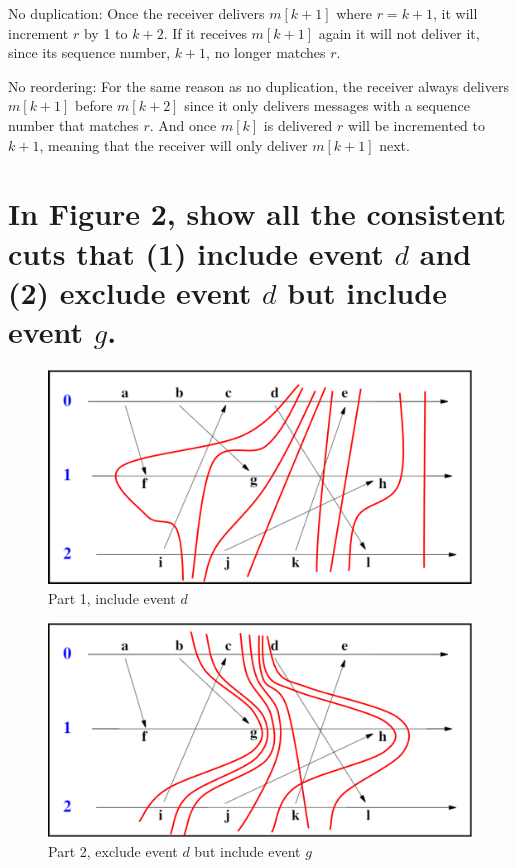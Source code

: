 \documentclass[times]{article}
\begin{document}
		No duplication: Once the receiver delivers $m[k+1]$ where $r=k+1$, it will increment $r$ by 1 to $k+2$. If it receives $m[k+1]$ again it will not deliver it, since its sequence number, $k+1$, no longer matches $r$.
		
		No reordering: For the same reason as no duplication, the receiver always delivers $m[k+1]$ before $m[k+2]$ since it only delivers messages with a sequence number that matches $r$. And once $m[k]$ is delivered $r$ will be incremented to $k+1$, meaning that the receiver will only deliver $m[k+1]$ next.
	
	\section{In Figure 2, show all the consistent cuts that (1) include event $d$ and (2) exclude event $d$ but include event $g$.}
		\begin{figure}[H]
			\caption{Part 1, include event $d$}
			\includegraphics[width=\linewidth]{q4/q4a.png}
		\end{figure}
		\begin{figure}[H]
			\caption{Part 2, exclude event $d$ but include event $g$}
			\includegraphics[width=\linewidth]{q4/q4b.png}
		\end{figure}
\end{document}
